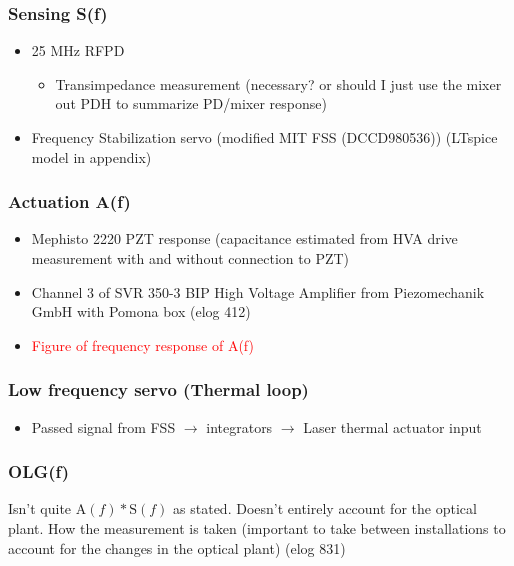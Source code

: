 \subsubsection{Sensing S(f)}
\begin{itemize}
\item 25 MHz RFPD
\begin{itemize}
\item Transimpedance measurement (necessary? or should I just use the mixer out PDH to summarize PD/mixer response)
\end{itemize}
\item Frequency Stabilization servo (modified MIT FSS (DCCD980536)) (LTspice model in appendix)
\end{itemize}


\subsubsection{Actuation A(f)}
\begin{itemize}
\item Mephisto 2220 PZT response (capacitance estimated from HVA drive measurement with and without connection to PZT)
\item Channel 3 of SVR 350-3 BIP High Voltage Amplifier from Piezomechanik GmbH with Pomona box (elog 412)
\item \textcolor{red}{Figure of frequency response of A(f)}

\end{itemize}

\subsubsection{Low frequency servo (Thermal loop)}
\begin{itemize}
\item Passed signal from FSS $\rightarrow$ integrators $\rightarrow$ Laser thermal actuator input
\end{itemize}

\subsubsection{OLG(f)}
Isn't quite $\mathrm{A}(f)*\mathrm{S}(f)$ as stated. Doesn't entirely account for the optical plant.
How the measurement is taken (important to take between installations to account for the changes in the optical plant) (elog 831)


